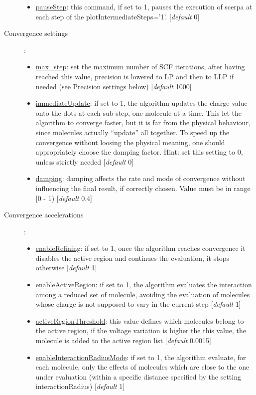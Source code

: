 \documentclass[a4paper,10pt]{article}
\begin{document}
\begin{description}
\begin{itemize}
	\item \underline{pauseStep}: this command, if set to 1, pauses the execution of scerpa at each step of the plotIntermediateSteps='1'. [\textit{default} 0] 
	\end{itemize}
\item[Convergence settings]:
	\begin{itemize}
	\item \underline{max\_step}: set the maximum number of SCF iterations, after having reached this value, precision is lowered to LP and then to LLP if needed (see Precision settings below) [\textit{default} 1000] 
	\item \underline{immediateUpdate}: if set to 1, the algorithm updates the charge value onto the dots at each sub-step, one molecule at a time. This let the algorithm to converge faster, but it is far from the physical behaviour, since molecules actually \enquote{update} all together. To speed up the convergence without loosing the physical meaning, one should appropriately choose the damping factor. Hint: set this setting to 0, unless strictly needed [\textit{default} 0] 
	\item \underline{damping}: damping affects the rate and mode of convergence without influencing the final result, if correctly chosen. Value must be in range [0 - 1) [\textit{default} 0.4] 
	\end{itemize}
\item[Convergence accelerations]:
	\begin{itemize}
	\item \underline{enableRefining}: if set to 1, once the algorithm reaches convergence it disables the active region and continues the evaluation, it stops otherwise [\textit{default} 1] 
	\item \underline{enableActiveRegion}: if set to 1, the algorithm evaluates the interaction among a reduced set of molecule, avoiding the evaluation of molecules whose charge is not supposed to vary in the current step [\textit{default} 1] 
	\item \underline{activeRegionThreshold}: this value defines which molecules belong to the active region, if the voltage variation is higher  the this value, the molecule is added to the active region list [\textit{default} 0.0015] 
	\item \underline{enableInteractionRadiusMode}: if set to 1, the algorithm evaluate, for each molecule, only the effects of molecules which are close to the one under evaluation (within a specific distance specified by the setting interactionRadius) [\textit{default} 1] 

\end{itemize}
\end{description}
\end{document}
